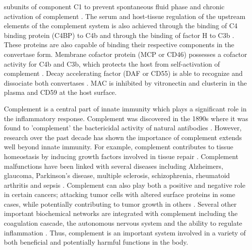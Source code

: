 \documentclass[12pt]{article}
\begin{document}
subunits of component C1 to prevent spontaneous fluid phase and chronic activation of complement \cite{walker1995complement}. The serum and host-tissue regulation of the upstream elements of the complement system is also achieved through the binding of C4 binding protein (C4BP) to C4b and through the binding of factor H to C3b \cite{blom2001structural}. These proteins are also capable of binding their respective components in the convertase form. Membrane cofactor protein (MCP or CD46) possesses a cofactor activity for C4b and C3b, which protects the host from self-activation of complement \cite{riley2004cd46}.  Decay accelerating factor (DAF or CD55) is able to recognize and dissociate both convertases \cite{lukacik2004complement}. MAC is inhibited by vitronectin and clusterin in the plasma and CD59 at the host surface.

Complement is a central part of innate immunity which plays a significant role in the inflammatory response.
Complement was discovered in the 1890s where it was found to 'complement' the bactericidal activity of natural antibodies \cite{sarma2011complement}.
However, research over the past decade has shown the importance of complement extends well beyond innate immunity.
For example, complement contributes to tissue homeostasis by inducing growth factors involved in tissue repair \cite{ricklin2010complement}.
Complement malfunctions have been linked with several diseases including Alzheimers, glaucoma, Parkinson's disease, multiple sclerosis, schizophrenia, rheumatoid arthritis and sepsis \cite{ricklin2007complement, rittirsch2008harmful}.
Complement can also play both a positive and negative role in certain cancers; attacking tumor cells with altered surface proteins in some cases, while potentially contributing to tumor growth in others \cite{sarma2011complement, ricklin2013complement}.
Several other important biochemical networks are integrated with complement including the coagulation cascade, the autonomous nervous system and the ability to regulate inflammation \cite{ricklin2013complement}. Thus, complement is an important system involved in a variety of both beneficial and potentially harmful functions in the body.
\end{document}
